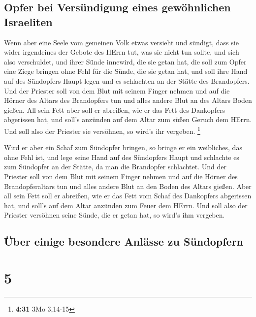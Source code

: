 \hypertarget{opfer-bei-versuxfcndigung-eines-gewuxf6hnlichen-israeliten}{%
\subsection{Opfer bei Versündigung eines gewöhnlichen
Israeliten}\label{opfer-bei-versuxfcndigung-eines-gewuxf6hnlichen-israeliten}}

 Wenn aber eine Seele vom gemeinen Volk etwas versieht
und sündigt, dass sie wider irgendeines der Gebote des HErrn tut, was
sie nicht tun sollte, und sich also verschuldet,  und
ihrer Sünde innewird, die sie getan hat, die soll zum Opfer eine Ziege
bringen ohne Fehl für die Sünde, die sie getan hat,  und
soll ihre Hand auf des Sündopfers Haupt legen und es schlachten an der
Stätte des Brandopfers.  Und der Priester soll von dem
Blut mit seinem Finger nehmen und auf die Hörner des Altars des
Brandopfers tun und alles andere Blut an des Altars Boden gießen.
 All sein Fett aber soll er abreißen, wie er das Fett des
Dankopfers abgerissen hat, und soll's anzünden auf dem Altar zum süßen
Geruch dem HErrn. Und soll also der Priester sie versöhnen, so wird's
ihr vergeben. \footnote{\textbf{4:31} 3Mo 3,14-15}

 Wird er aber ein Schaf zum Sündopfer bringen, so bringe
er ein weibliches, das ohne Fehl ist,  und lege seine
Hand auf des Sündopfers Haupt und schlachte es zum Sündopfer an der
Stätte, da man die Brandopfer schlachtet.  Und der
Priester soll von dem Blut mit seinem Finger nehmen und auf die Hörner
des Brandopferaltars tun und alles andere Blut an den Boden des Altars
gießen.  Aber all sein Fett soll er abreißen, wie er das
Fett vom Schaf des Dankopfers abgerissen hat, und soll's auf dem Altar
anzünden zum Feuer dem HErrn. Und soll also der Priester versöhnen seine
Sünde, die er getan hat, so wird's ihm vergeben.

\hypertarget{uxfcber-einige-besondere-anluxe4sse-zu-suxfcndopfern}{%
\subsection{Über einige besondere Anlässe zu
Sündopfern}\label{uxfcber-einige-besondere-anluxe4sse-zu-suxfcndopfern}}

\hypertarget{section-4}{%
\section{5}\label{section-4}}

